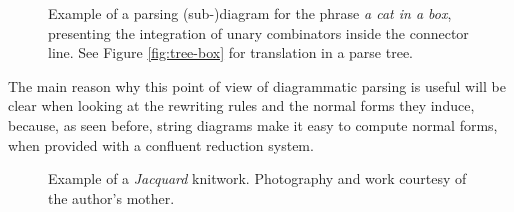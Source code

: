 \begin{figure}
	\centering
	\caption{Example of a parsing (sub-)diagram for the phrase
		\emph{a cat in a box}, presenting the integration of unary combinators
		inside the connector line. See Figure \ref{fig:tree-box} for translation in
		a parse tree.}
	\label{fig:parsing-diagram2}
\end{figure}

The main reason why this point of view of diagrammatic parsing is useful
will be clear when looking at the rewriting rules and the normal forms they
induce, because, as seen before, string diagrams make it easy to compute
normal forms, when provided with a confluent reduction system.

\begin{figure}
	\centering
	\caption{Example of a \emph{Jacquard} knitwork. Photography and work courtesy
		of the author's mother.}
	\label{fig:knitting-example}
\end{figure}

